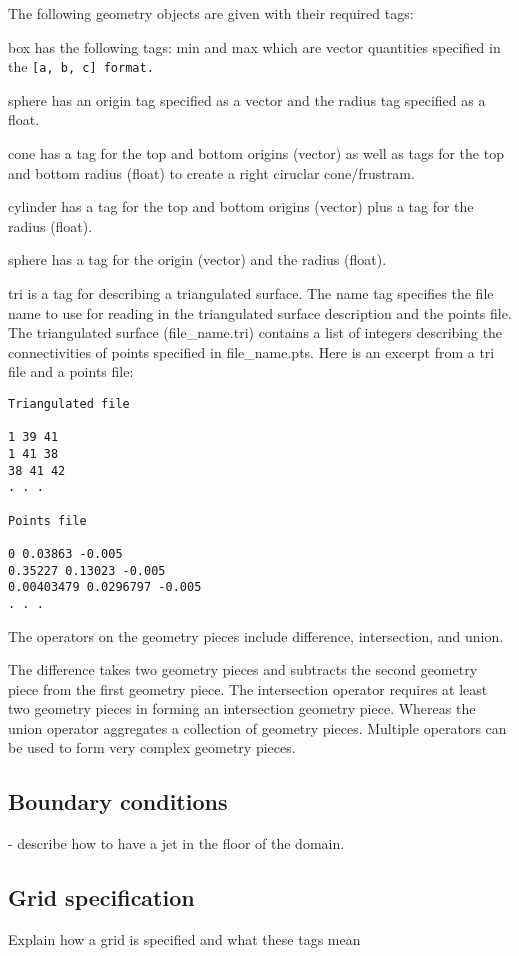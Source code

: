 The following geometry objects are given with their required tags:

box has the following tags: min and max which are vector quantities
specified in the \tt [a, b, c] \normalfont format.

sphere has an origin tag specified as a vector and the radius tag
specified as a float.

cone has a tag for the top and bottom origins (vector) as well as tags for the
top and bottom radius (float) to create a right ciruclar cone/frustram.

cylinder has a tag for the top and bottom origins (vector) plus a tag
for the radius (float).

sphere has a tag for the origin (vector) and the radius (float).

tri is a tag for describing a triangulated surface.  The name tag
specifies the file name to use for reading in the triangulated surface
description and the points file.  The triangulated surface
(file_name.tri) contains a list of integers describing the
connectivities of points specified in file_name.pts.  Here is an
excerpt from a tri file and a points file:


\begin{verbatim}
Triangulated file

1 39 41
1 41 38
38 41 42   
. . .

Points file

0 0.03863 -0.005
0.35227 0.13023 -0.005
0.00403479 0.0296797 -0.005
. . . 

\end{verbatim}


The operators on the geometry pieces include difference, intersection,
and union.

The difference takes two geometry pieces and subtracts the second
geometry piece from the first geometry piece.  The intersection
operator requires at least two geometry pieces in forming an
intersection geometry piece.  Whereas the union operator aggregates a
collection of geometry pieces.  Multiple operators can be used to form
very complex geometry pieces.



\subsection{Boundary conditions}
- describe how to have a jet in the floor of the domain.
%
\subsection{Grid specification} \label{Sec:Grid}
Explain how a grid is specified and what these tags mean

